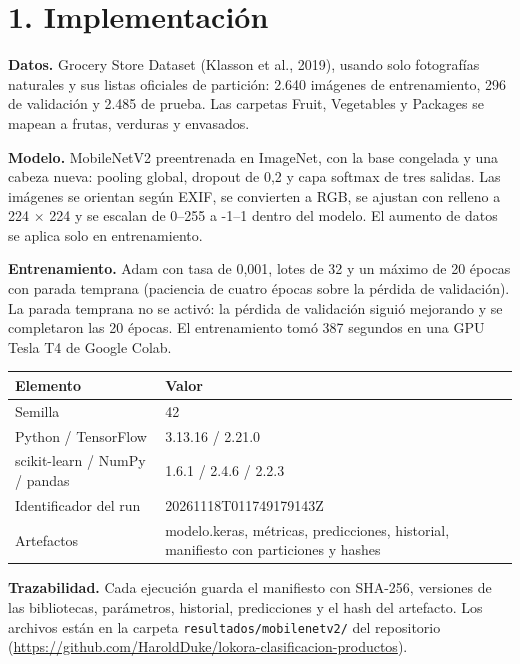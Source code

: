 \documentclass[11pt,a4paper]{article}
\begin{document}
\section*{1. Implementación}
\noindent \textbf{Datos.} Grocery Store Dataset (Klasson et al., 2019), usando solo fotografías naturales y sus listas oficiales de partición: 2.640 imágenes de entrenamiento, 296 de validación y 2.485 de prueba. Las carpetas Fruit, Vegetables y Packages se mapean a frutas, verduras y envasados.\par
\noindent \textbf{Modelo.} MobileNetV2 preentrenada en ImageNet, con la base congelada y una cabeza nueva: pooling global, dropout de 0,2 y capa softmax de tres salidas. Las imágenes se orientan según EXIF, se convierten a RGB, se ajustan con relleno a 224 $\times$ 224 y se escalan de 0--255 a -1--1 dentro del modelo. El aumento de datos se aplica solo en entrenamiento.\par
\noindent \textbf{Entrenamiento.} Adam con tasa de 0,001, lotes de 32 y un máximo de 20 épocas con parada temprana (paciencia de cuatro épocas sobre la pérdida de validación). La parada temprana no se activó: la pérdida de validación siguió mejorando y se completaron las 20 épocas. El entrenamiento tomó 387 segundos en una GPU Tesla T4 de Google Colab.\par
\begin{center}\small
\begin{tabularx}{\textwidth}{XX}
\toprule
\textbf{Elemento} & \textbf{Valor} \\
\midrule
Semilla & 42 \\
Python / TensorFlow & 3.13.16 / 2.21.0 \\
scikit-learn / NumPy / pandas & 1.6.1 / 2.4.6 / 2.2.3 \\
Identificador del run & 20261118T011749179143Z \\
Artefactos & modelo.keras, métricas, predicciones, historial, manifiesto con particiones y hashes \\
\bottomrule
\end{tabularx}
\end{center}
\noindent \textbf{Trazabilidad.} Cada ejecución guarda el manifiesto con SHA-256, versiones de las bibliotecas, parámetros, historial, predicciones y el hash del artefacto. Los archivos están en la carpeta \texttt{resultados/mobilenetv2/} del repositorio (\url{https://github.com/HaroldDuke/lokora-clasificacion-productos}).\par
\end{document}
